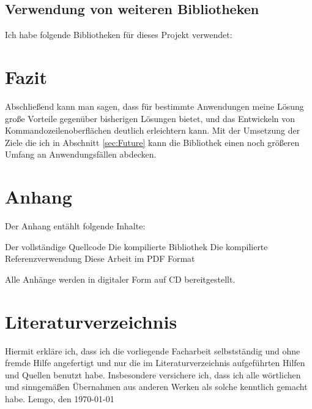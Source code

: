 \documentclass[a4paper,11pt,titlepage,ngerman]{article}
\newcommand{\inlinecode}[1]{{\lstinline[language=]$#1$}}
\begin{document}
\begin{sloppypar}
  \subsection{Verwendung von weiteren Bibliotheken}\label{subsec:UsageOfLibraries}
  Ich habe folgende Bibliotheken für dieses Projekt verwendet:
  \section{Fazit}\label{sec:Conclusion}
Abschlie\ss end kann man sagen, dass für bestimmte Anwendungen meine Lösung gro\ss e Vorteile gegenüber bisherigen Lösungen bietet, 
  und das Entwickeln von Kommandozeilenoberflächen deutlich erleichtern kann.
Mit der Umsetzung der Ziele die ich in Abschnitt \ref{sec:Future} kann die Bibliothek einen noch grö\ss eren Umfang an Anwendungsfällen abdecken. 
  \newpage
  \section{Anhang}\label{sec:Attachments}
  Der Anhang entählt folgende Inhalte:
  \begin{outline}
   \1 Der vollständige Quellcode
   \1 Die kompilierte Bibliothek
   \1 Die kompilierte Referenzverwendung
   \1 Diese Arbeit im PDF Format
  \end{outline}
  Alle Anhänge werden in digitaler Form auf CD bereitgestellt.
  \section{Literaturverzeichnis}\label{sec:Literature}
  \printbibliography[heading=none]
  \newpage
  \begin{samepage}
	\thispagestyle{empty}
	Hiermit erkläre ich, dass ich die vorliegende Facharbeit selbstständig und ohne fremde Hilfe angefertigt und nur die im Literaturverzeichnis
	aufgeführten Hilfen und Quellen benutzt habe.
	Insbesondere versichere ich, dass ich alle wörtlichen
	und sinngemä\ss en Übernahmen aus anderen Werken als solche kenntlich gemacht habe.
	\medbreak
	Lemgo, den \today
	\medbreak
  \end{samepage}
 \end{sloppypar}
\end{document}
